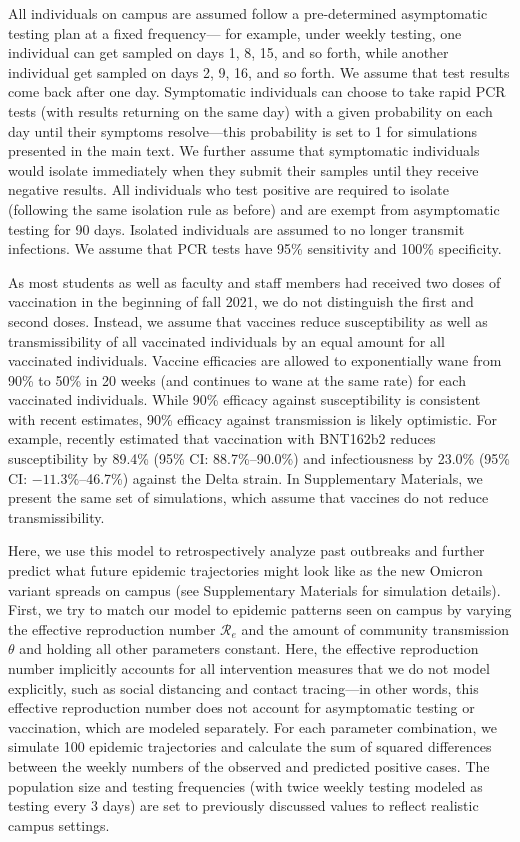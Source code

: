 \documentclass[12pt]{article}
\begin{document}
All individuals on campus are assumed follow a pre-determined asymptomatic testing plan at a fixed frequency---
for example, under weekly testing, one individual can get sampled on days 1, 8, 15, and so forth, while another individual get sampled on days 2, 9, 16, and so forth.
We assume that test results come back after one day.
Symptomatic individuals can choose to take rapid PCR tests (with results returning on the same day) with a given probability on each day until their symptoms resolve---this probability is set to 1 for simulations presented in the main text.
We further assume that symptomatic individuals would isolate immediately when they submit their samples until they receive negative results.
All individuals who test positive are required to isolate (following the same isolation rule as before) and are exempt from asymptomatic testing for 90 days.
Isolated individuals are assumed to no longer transmit infections.
We assume that PCR tests have 95\% sensitivity and 100\% specificity.

As most students as well as faculty and staff members had received two doses of vaccination in the beginning of fall 2021, we do not distinguish the first and second doses.
Instead, we assume that vaccines reduce susceptibility as well as transmissibility of all vaccinated individuals by an equal amount for all vaccinated individuals.
Vaccine efficacies are allowed to exponentially wane from 90\% to 50\% in 20 weeks (and continues to wane at the same rate) for each vaccinated individuals.
While 90\% efficacy against susceptibility is consistent with recent estimates, 90\% efficacy against transmission is likely optimistic.
For example, \cite{prunas2022vaccination} recently estimated that vaccination with BNT162b2 reduces susceptibility by 89.4\% (95\% CI: 88.7\%--90.0\%) and infectiousness by 23.0\% (95\% CI: $-11.3\%$--46.7\%) against the Delta strain.
In Supplementary Materials, we present the same set of simulations, which assume that vaccines do not reduce transmissibility.

Here, we use this model to retrospectively analyze past outbreaks and further predict what future epidemic trajectories might look like as the new Omicron variant spreads on campus (see Supplementary Materials for simulation details).
First, we try to match our model to epidemic patterns seen on campus by varying the effective reproduction number $\mathcal R_e$ and the amount of community transmission $\theta$ and holding all other parameters constant.
Here, the effective reproduction number implicitly accounts for all intervention measures that we do not model explicitly, such as social distancing and contact tracing---in other words, this effective reproduction number does not account for asymptomatic testing or vaccination, which are modeled separately.
For each parameter combination, we simulate 100 epidemic trajectories and calculate the sum of squared differences between the weekly numbers of the observed and predicted positive cases.
The population size and testing frequencies (with twice weekly testing modeled as testing every 3 days) are set to previously discussed values to reflect realistic campus settings.
\end{document}
